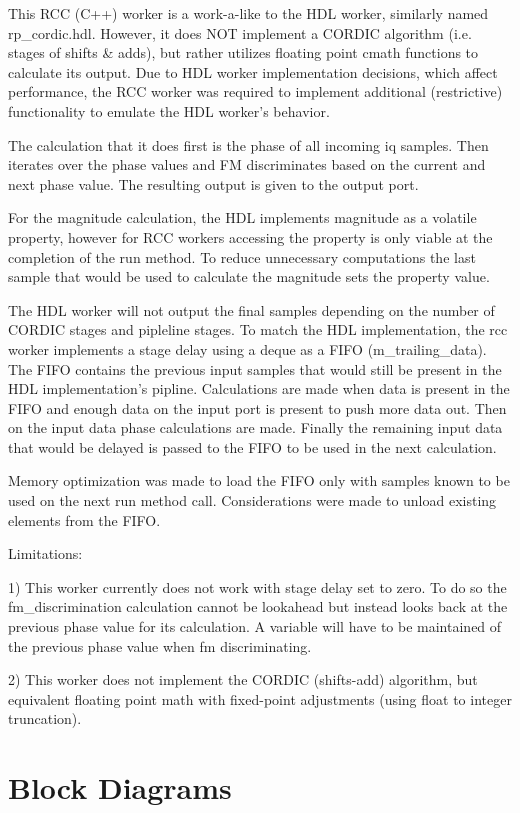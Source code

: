 \documentclass{article}
\begin{document}
This RCC (C++) worker is a work-a-like to the HDL worker, similarly named rp\_cordic.hdl.
However, it does NOT implement a CORDIC algorithm (i.e. stages of shifts \& adds), but rather utilizes floating point cmath functions to calculate its output.
Due to HDL worker implementation decisions, which affect performance, the RCC worker was required to implement additional (restrictive) functionality to emulate the HDL worker's behavior.

The calculation that it does first is the phase of all incoming iq samples. Then iterates over the phase values and FM discriminates based on the current and next phase value. 
The resulting output is given to the output port.

For the magnitude calculation, the HDL implements magnitude as a volatile property, however for RCC workers accessing the property is only viable at the completion of the run method. 
To reduce unnecessary computations the last sample that would be used to calculate the magnitude sets the property value.
 
The HDL worker will not output the final samples depending on the number of CORDIC stages and pipleline stages. 
To match the HDL implementation, the rcc worker implements a stage delay using a deque as a FIFO (m\_trailing\_data).
The FIFO contains the previous input samples that would still be present in the HDL implementation's pipline. 
Calculations are made when data is present in the FIFO and enough data on the input port is present to push more data out.
Then on the input data phase calculations are made.
Finally the remaining input data that would be delayed is passed to the FIFO to be used in the next calculation.  

Memory optimization was made to load the FIFO only with samples known to be used on the next run method call.  Considerations were made to unload existing elements from the FIFO. 

Limitations:  

1) This worker currently does not work with stage delay set to zero. 
To do so the fm\_discrimination calculation cannot be lookahead but instead looks back at the previous phase value for its calculation.
A variable will have to be maintained of the previous phase value when fm discriminating.

2) This worker does not implement the CORDIC (shifts-add) algorithm, but equivalent floating point math with fixed-point adjustments (using float to integer truncation).
\section*{Block Diagrams}
\end{document}
